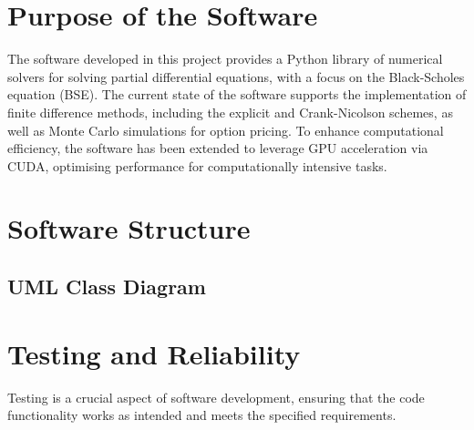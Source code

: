 %


\section{Purpose of the Software}
\label{sec:software_purpose}
The software developed in this project provides a Python library of numerical solvers for solving partial differential equations, with a focus on the Black-Scholes equation (BSE).
The current state of the software supports the implementation of finite difference methods, including the explicit and Crank-Nicolson schemes, as well as Monte Carlo simulations for option pricing.
To enhance computational efficiency, the software has been extended to leverage GPU acceleration via CUDA, optimising performance for computationally intensive tasks. 

\section{Software Structure} \label{sec:software_structure}

\subsection{UML Class Diagram}


\section{Testing and Reliability} \label{sec:software_testing}
Testing is a crucial aspect of software development, ensuring that the code functionality works as intended and meets the specified requirements. 